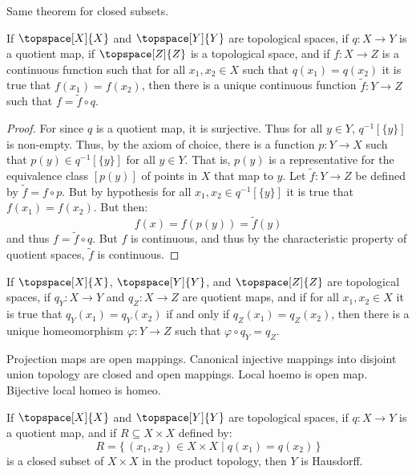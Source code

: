 \documentclass{article}                                                        %
\begin{document}
        Same theorem for closed subsets.
        \begin{theorem}
            If $\topspace[X]{X}$ and $\topspace[Y]{Y}$ are topological spaces,
            if $q:X\rightarrow{Y}$ is a quotient map, if $\topspace[Z]{Z}$ is a
            topological space, and if $f:X\rightarrow{Z}$ is a continuous
            function such that for all $x_{1},x_{2}\in{X}$ such that
            $q(x_{1})=q(x_{2})$ it is true that $f(x_{1})=f(x_{2})$, then there
            is a unique continuous function $\tilde{f}:Y\rightarrow{Z}$ such
            that $f=\tilde{f}\circ{q}$.
        \end{theorem}
        \begin{proof}
            For since $q$ is a quotient map, it is surjective. Thus for all
            $y\in{Y}$, $q^{\minus{1}}[\{y\}]$ is non-empty. Thus, by the axiom
            of choice, there is a function $p:Y\rightarrow{X}$ such
            that $p(y)\in{q}^{\minus{1}}[\{y\}]$ for all $y\in{Y}$. That is,
            $p(y)$ is a representative for the equivalence class $[p(y)]$ of
            points in $X$ that map to $y$. Let $\tilde{f}:Y\rightarrow{Z}$ be
            defined by $\tilde{f}=f\circ{p}$. But by hypothesis for all
            $x_{1},x_{2}\in{q}^{\minus{1}}[\{y\}]$ it is true that
            $f(x_{1})=f(x_{2})$. But then:
            \begin{equation}
                f(x)=f(p(y))=\tilde{f}(y)
            \end{equation}
            and thus $f=\tilde{f}\circ{q}$. But $f$ is continuous, and thus by
            the characteristic property of quotient spaces, $\tilde{f}$ is
            continuous.
        \end{proof}
        \begin{theorem}
            If $\topspace[X]{X}$, $\topspace[Y]{Y}$, and $\topspace[Z]{Z}$ are
            topological spaces, if $q_{Y}:X\rightarrow{Y}$ and
            $q_{Z}:X\rightarrow{Z}$ are quotient maps, and if for all
            $x_{1},x_{2}\in{X}$ it is true that $q_{Y}(x_{1})=q_{Y}(x_{2})$ if
            and only if $q_{Z}(x_{1})=q_{Z}(x_{2})$, then there is a unique
            homeomorphism $\varphi:Y\rightarrow{Z}$ such that
            $\varphi\circ{q_{Y}}=q_{Z}$.
        \end{theorem}
        Projection maps are open mappings. Canonical injective mappings into
        disjoint union topology are closed and open mappings. Local hoemo is
        open map. Bijective local homeo is homeo.
        \begin{theorem}
            If $\topspace[X]{X}$ and $\topspace[Y]{Y}$ are topological spaces,
            if $q:X\rightarrow{Y}$ is a quotient map, and if
            $R\subseteq{X}\times{X}$ defined by:
            \begin{equation}
                R=\{\,(x_{1},x_{2})\in{X}\times{X}\;|\;q(x_{1})=q(x_{2})\,\}
            \end{equation}
            is a closed subset of $X\times{X}$ in the product topology, then
            $Y$ is Hausdorff.
        \end{theorem}
\end{document}
